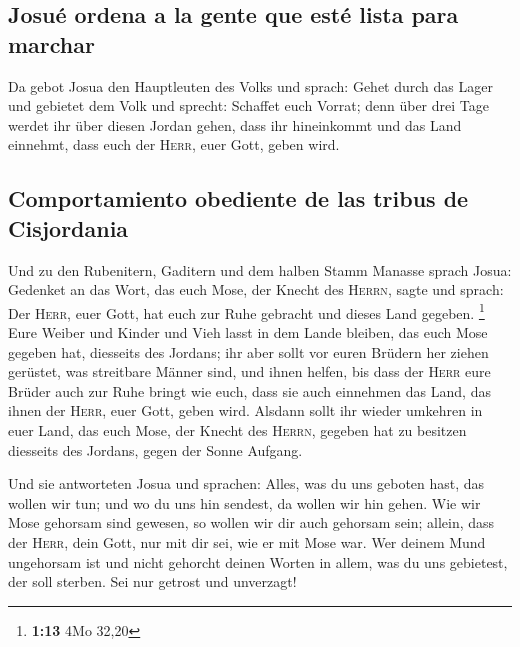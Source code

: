 \hypertarget{josuuxe9-ordena-a-la-gente-que-estuxe9-lista-para-marchar}{%
\subsection{Josué ordena a la gente que esté lista para
marchar}\label{josuuxe9-ordena-a-la-gente-que-estuxe9-lista-para-marchar}}

 Da gebot Josua den Hauptleuten des Volks und sprach:
 Gehet durch das Lager und gebietet dem Volk und sprecht:
Schaffet euch Vorrat; denn über drei Tage werdet ihr über diesen Jordan
gehen, dass ihr hineinkommt und das Land einnehmt, dass euch der
\textsc{Herr}, euer Gott, geben wird.

\hypertarget{comportamiento-obediente-de-las-tribus-de-cisjordania}{%
\subsection{Comportamiento obediente de las tribus de
Cisjordania}\label{comportamiento-obediente-de-las-tribus-de-cisjordania}}

 Und zu den Rubenitern, Gaditern und dem halben Stamm
Manasse sprach Josua:  Gedenket an das Wort, das euch
Mose, der Knecht des \textsc{Herrn}, sagte und sprach: Der
\textsc{Herr}, euer Gott, hat euch zur Ruhe gebracht und dieses Land
gegeben. \footnote{\textbf{1:13} 4Mo 32,20}  Eure Weiber
und Kinder und Vieh lasst in dem Lande bleiben, das euch Mose gegeben
hat, diesseits des Jordans; ihr aber sollt vor euren Brüdern her ziehen
gerüstet, was streitbare Männer sind, und ihnen helfen, 
bis dass der \textsc{Herr} eure Brüder auch zur Ruhe bringt wie euch,
dass sie auch einnehmen das Land, das ihnen der \textsc{Herr}, euer
Gott, geben wird. Alsdann sollt ihr wieder umkehren in euer Land, das
euch Mose, der Knecht des \textsc{Herrn}, gegeben hat zu besitzen
diesseits des Jordans, gegen der Sonne Aufgang.

 Und sie antworteten Josua und sprachen: Alles, was du
uns geboten hast, das wollen wir tun; und wo du uns hin sendest, da
wollen wir hin gehen.  Wie wir Mose gehorsam sind
gewesen, so wollen wir dir auch gehorsam sein; allein, dass der
\textsc{Herr}, dein Gott, nur mit dir sei, wie er mit Mose war.
 Wer deinem Mund ungehorsam ist und nicht gehorcht deinen
Worten in allem, was du uns gebietest, der soll sterben. Sei nur getrost
und unverzagt!

